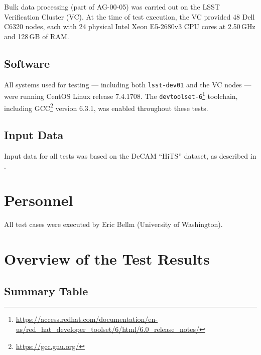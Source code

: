 \documentclass[DM,lsstdraft,STR,toc]{lsstdoc}
\begin{document}
Bulk data processing (part of AG-00-05) was carried out on the LSST Verification Cluster (VC).
At the time of test execution, the VC provided 48 Dell C6320 nodes, each with 24 physical Intel Xeon E5-2680v3 CPU cores at 2.50\,GHz and 128\,GB of RAM.

\subsection{Software}
\label{sect:swconf}

All systems used for testing --- including both \texttt{lsst-dev01} and the VC nodes --- were running CentOS Linux release 7.4.1708.
The \texttt{devtoolset-6}\footnote{\url{https://access.redhat.com/documentation/en-us/red_hat_developer_toolset/6/html/6.0_release_notes/}} toolchain, including GCC\footnote{\url{https://gcc.gnu.org/}} version 6.3.1, was enabled throughout these tests.

\subsection{Input Data}
\label{sect:inputdata}

Input data for all tests was based on the DeCAM “HiTS” dataset, as described in .

\section{Personnel}
\label{sect:personnel}

All test cases were executed by Eric Bellm (University of Washington).

\newpage

\section{Overview of the Test Results}
\label{sect:overview}

\subsection{Summary Table}
\label{sect:summarytable}
\end{document}
